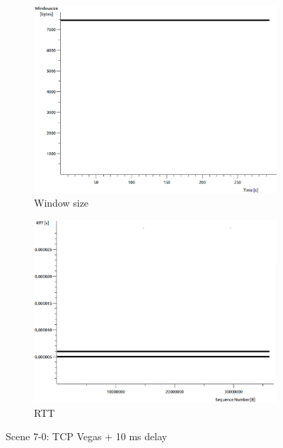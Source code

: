 \documentclass[conference,a4paper]{../../sty/IEEEtran}
\begin{document}
\begin{figure}
\begin{subfigure}[b]{0.2\textwidth}
  \includegraphics[width=\textwidth]{s7-0_wsize}
  \caption{Window size}
 \end{subfigure}
 \begin{subfigure}[b]{0.2\textwidth}
  \includegraphics[width=\textwidth]{s7-0_rtt}
  \caption{RTT}
 \end{subfigure}
 \caption{Scene 7-0: TCP Vegas + 10 ms delay}
\end{figure}
\end{document}
